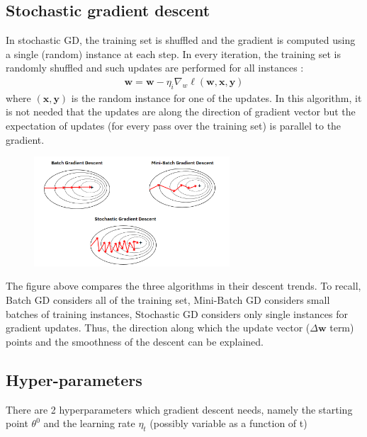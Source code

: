 \documentclass[12pt]{article}
\begin{document}
\subsection{Stochastic gradient descent}
In stochastic GD, the training set is shuffled and the gradient is computed using a single (random) instance at each step. In every iteration, the training set is randomly shuffled and such updates are performed for all instances :
\begin{align*}
\mathbf{w} = \mathbf{w} - \eta_i \nabla_w\ell(\mathbf{w},\mathbf{x},\mathbf{y})
\end{align*}
where $(\mathbf{x}, \mathbf{y})$ is the random instance for one of the updates. In this algorithm, it is not needed that the updates are along the direction of gradient vector but the expectation of updates (for every pass over the training set) is parallel to the gradient.


\begin{figure}[H]
    \centering
    \includegraphics[width=0.65\textwidth]{gradDes.png}
\end{figure}


The figure above compares the three algorithms in their descent trends. To recall, Batch GD considers all of the training set, Mini-Batch GD considers small batches of training instances, Stochastic GD considers only single instances for gradient updates. Thus, the direction along which the update vector ($\Delta{\mathbf{w}}$ term) points and the smoothness of the descent can be explained.


\subsection{Hyper-parameters}
There are 2 hyperparameters which gradient descent needs, namely the starting point $\theta^0$ and the learning rate $\eta_t$ (possibly variable as a function of t)
\end{document}
